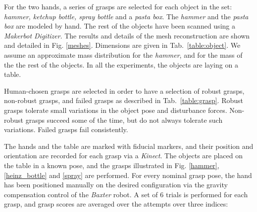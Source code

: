 For the two hands, a series of grasps are selected for each object in the set:
\emph{hammer, ketchup bottle, spray bottle} and a \emph{pasta box}.
The \emph{hammer} and the \emph{pasta box} are modeled by hand. The rest of the objects have been scanned using a \emph{Makerbot Digitizer}. The results and details of the mesh reconstruction are shown and detailed in Fig. \ref{meshes}.
Dimensions are given in Tab.~\ref{table:object}.
We assume an approximate mass distribution for the \emph{hammer}, and for the mass of the the rest of the objects.
In all the experiments, the objects are laying on a table.


Human-chosen grasps are selected in order to have a selection of robust grasps, non-robust grasps, and failed grasps as described in Tab.~\ref{table:grasp}. Robust grasps tolerate small variations in the object pose and disturbance forces. Non-robust grasps succeed some of the time, but do not always tolerate such variations.  Failed grasps fail consistently.  

The hands and the table are marked with fiducial markers, and their position and orientation are recorded for each grasp via a \emph{Kinect}. The objects are placed on the table in a known pose, and the grasps illustrated in Fig. \ref{hammer}, \ref{heinz_bottle} and \ref{spray} are performed. For every nominal grasp pose, the hand has been positioned manually on the desired configuration via the gravity compensation control of the \emph{Baxter} robot. A set of $6$ trials is performed for each grasp, and grasp scores are averaged over the attempts over three indices:

